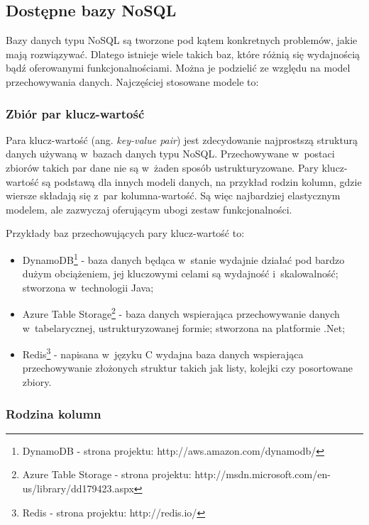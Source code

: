 \subsection{Dostępne bazy NoSQL}

Bazy danych typu NoSQL są tworzone pod kątem konkretnych problemów, jakie mają rozwiązywać.
Dlatego istnieje wiele takich baz, które różnią się wydajnością bądź oferowanymi funkcjonalnościami.
Można je podzielić ze względu na model przechowywania danych.
Najczęściej stosowane modele to:

\subsubsection{Zbiór par klucz-wartość}

Para klucz-wartość (ang. \emph{key-value pair}) jest zdecydowanie najprostszą strukturą danych używaną w~bazach danych typu NoSQL.
Przechowywane w~postaci zbiorów takich par dane nie są w~żaden sposób ustrukturyzowane.
Pary klucz-wartość są podstawą dla innych modeli danych, na przykład rodzin kolumn, gdzie wiersze składają się z~par kolumna-wartość.
Są więc najbardziej elastycznym modelem, ale zazwyczaj oferującym ubogi zestaw funkcjonalności.

Przykłady baz przechowujących pary klucz-wartość to:

\begin{itemize}
 \item DynamoDB\footnote{DynamoDB - strona projektu: http://aws.amazon.com/dynamodb/} - baza danych będąca w~stanie wydajnie działać pod bardzo dużym obciążeniem, jej kluczowymi celami są wydajność i~skalowalność; stworzona w~technologii Java;
 \item Azure Table Storage\footnote{Azure Table Storage - strona projektu: http://msdn.microsoft.com/en-us/library/dd179423.aspx} - baza danych wspierająca przechowywanie danych w~tabelarycznej, ustrukturyzowanej formie; stworzona na platformie .Net;
 \item Redis\footnote{Redis - strona projektu: http://redis.io/} - napisana w~języku C wydajna baza danych wspierająca przechowywanie złożonych struktur takich jak listy, kolejki czy posortowane zbiory.
\end{itemize}

\subsubsection{Rodzina kolumn} \label{sec:column_family}

